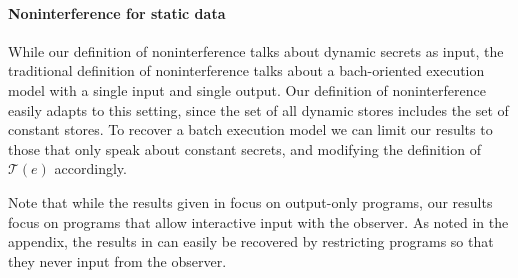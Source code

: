 \documentclass[conference]{IEEEtran}
\theoremstyle{definition}
\newcommand{\prin}{\textit{O}}
\newcommand{\traces}[1]{\mathcal{T}(#1)}
\newcommand{\tr}{t\xspace}
\begin{document}
\paragraph*{Noninterference for static data}

While our definition of noninterference talks about dynamic
secrets as input, the traditional definition of noninterference talks
about a bach-oriented execution model with a single input and single
output.  Our definition of noninterference easily adapts to this
setting, since the set of all dynamic stores includes the set of
constant stores.  To recover a batch execution model we can limit our
results to those that only speak about constant secrets, and
modifying the definition of $\traces{e}$ accordingly.

Note that while the results given in \cite{Balliu:11} focus on
output-only programs, our results focus on programs that allow
interactive input with the observer.  As noted in the appendix, the
results in \cite{Balliu:11} can easily be recovered by restricting
programs so that they never input from the observer.




\end{document}
